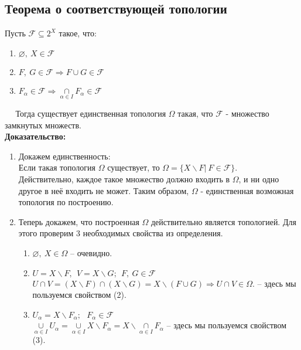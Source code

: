 \subsection{Теорема о соответствующей топологии}
  Пусть $ \mathcal{F} \subseteq 2^{X}$  такое, что:
\begin{enumerate}
\item $\varnothing ,~X\in \mathcal{F}$
\item $F,~G\in \mathcal{F} \Longrightarrow F\cup G\in \mathcal{F}$
\item $F_{\alpha}\in \mathcal{F} \Longrightarrow \underset{\alpha\in I}{\cap}F_{\alpha}\in \mathcal{F}$
\end{enumerate}
$~~~~~~$Тогда существует единственная топология $\Omega$ такая, что $\mathcal{F}$ - множество замкнутых множеств.
\\
\textbf{Доказательство:}
 \begin{enumerate}
\item Докажем единственность:\\
Если такая топология $\Omega$ существует, то $\Omega = \lbrace X\backslash F|~F\in \mathcal{F}\rbrace$.
\\ Действительно, каждое такое множество должно входить в $\Omega$, и ни одно другое в неё входить не может. Таким образом, $\Omega$ - единственная возможная топология по построению.
\item Теперь докажем, что построенная $\Omega$ действительно является топологией. Для этого проверим 3 необходимых свойства из определения.
\begin{enumerate}
\item $\varnothing,~X \in\Omega$ -- очевидно.
\item $U = X\backslash F,~~V=X\backslash G; ~~F,~G\in \mathcal{F}$
\\$U\cap V = (X\backslash F)\cap (X\backslash G)=X\backslash (F\cup G) \Longrightarrow U\cap V\in\Omega.$ -- здесь мы пользуемся свойством (2).
\item $U_{\alpha} = X\backslash F_{\alpha};~~~F_{\alpha}\in \mathcal{F}$
\\$\underset{\alpha\in I}{\cup}U_{\alpha} = \underset{\alpha\in I}{\cup}X\backslash F_{\alpha} = X\backslash\underset{\alpha\in I}{\cap}F_{\alpha}$ -- здесь мы пользуемся свойством (3).
\end{enumerate} 
\end{enumerate}
\newpage
